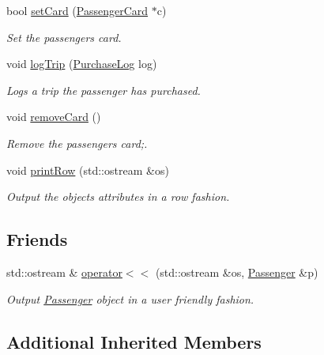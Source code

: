 \begin{DoxyCompactItemize}
bool \mbox{\hyperlink{classPassenger_a09fa79cfc599fa16f54fc34db0b56ea4}{set\+Card}} (\mbox{\hyperlink{classPassengerCard}{Passenger\+Card}} $\ast$c)
\begin{DoxyCompactList}\small\item\em Set the passenger\textquotesingle{}s card. \end{DoxyCompactList}\item 
void \mbox{\hyperlink{classPassenger_ad61aeee59fcdb0084a6cc12d16305d12}{log\+Trip}} (\mbox{\hyperlink{classPurchaseLog}{Purchase\+Log}} log)
\begin{DoxyCompactList}\small\item\em Logs a trip the passenger has purchased. \end{DoxyCompactList}\item 
void \mbox{\hyperlink{classPassenger_a7afe05c6e57aa998954b878a5b632dac}{remove\+Card}} ()
\begin{DoxyCompactList}\small\item\em Remove the passenger\textquotesingle{}s card;. \end{DoxyCompactList}\item 
void \mbox{\hyperlink{classPassenger_a72e4042544557a3dd9c02198aa2582d8}{print\+Row}} (std\+::ostream \&os)
\begin{DoxyCompactList}\small\item\em Output the object\textquotesingle{}s attributes in a row fashion. \end{DoxyCompactList}\end{DoxyCompactItemize}
\subsection*{Friends}
\begin{DoxyCompactItemize}
\item 
std\+::ostream \& \mbox{\hyperlink{classPassenger_a7b1aeaded08562578690b788f39db888}{operator$<$$<$}} (std\+::ostream \&os, \mbox{\hyperlink{classPassenger}{Passenger}} \&p)
\begin{DoxyCompactList}\small\item\em Output \mbox{\hyperlink{classPassenger}{Passenger}} object in a user friendly fashion. \end{DoxyCompactList}\end{DoxyCompactItemize}
\subsection*{Additional Inherited Members}


